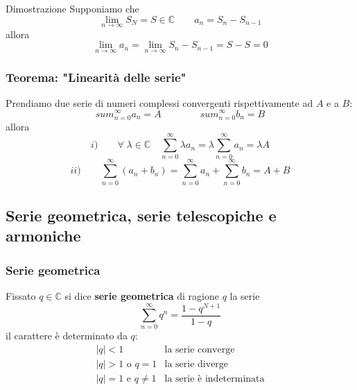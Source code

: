 \documentclass[x11names]{article}
\begin{document}
	\begin{es}{Dimostrazione}
		Supponiamo che 
		\[
		\lim_{n\to\infty}S_N = S \in \mathbb{C} \qquad a_n = S_n - S_{n-1}
		\]
		allora
		\[
		\lim_{n\to\infty} a_n = \lim_{n\to\infty} S_n - S_{n-1} = S - S = 0 
		\]
	\end{es}
	
	\begin{center}
		\colorbox{myred}{\begin{minipage}{5.75in}
				\begin{redes}{}
					\subsubsection{Teorema: "Linearità delle serie"}
					Prendiamo due serie di numeri complessi convergenti rispettivamente ad \(A\) e a \(B\):
					\[ 
					sum_{n=0}^{\infty} a_{n} = A \qquad\qquad sum_{n=0}^{\infty} b_{n} = B
					\]
					allora
					\[ 
					i) \qquad \forall \; \lambda \in \mathbb{C} \quad  \sum_{n=0}^{\infty} \lambda a_{n} = \lambda \sum_{n=0}^{\infty}  a_{n}= \lambda A
					\]
					\[ 
					ii) \qquad \sum_{n=0}^{\infty}  (a_{n} + b_{n} )= \sum_{n=0}^{\infty} a_{n} + \sum_{n=0}^{\infty} b_{n} = A + B
					\]
				\end{redes}
		\end{minipage}}        
	\end{center}
	
	\subsection{Serie geometrica, serie telescopiche e armoniche}
	\subsubsection{Serie geometrica}
	Fissato \(q \in \mathbb{C}\) si dice \textbf{serie geometrica} di ragione \(q\) la serie
	\[ 
	\sum_{n=0}^{\infty} q^n = \frac{1-q^{N+1}}{1-q}
	\]
	il carattere è determinato da \(q\):
	\[ 
	\begin{array}{lc}
		|q| < 1 & \text{la serie converge} \\
		|q| > 1 \text{ o } q = 1 & \text{la serie diverge} \\
		|q| = 1 \text{ e } q \neq 1 & \text{la serie è indeterminata} \\
	\end{array}
	\] \\
	
\end{document}
